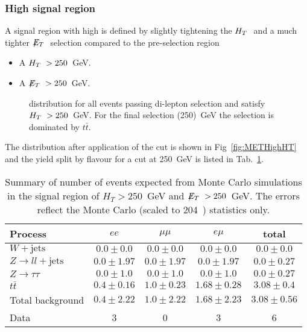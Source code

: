 \subsubsection{High \MET signal region}

A signal region with high \MET is defined by slightly tightening the $H_T~$ 
and a much tighter $\displaystyle{\not} E_T~$ selection compared to the pre-selection region
\begin{itemize}
\item A $H_T~>250$~GeV.
\item A $\displaystyle{\not} E_T~>250$~GeV.
\end{itemize}

\begin{figure}[hbtp]
  \hfill
  \caption{\MET distribution for all events passing di-lepton selection and satisfy $H_T~> 250$~GeV. For the final \MET selection (250)~GeV the selection is dominated by $t\bar{t}$.}
\end{figure}

The \MET distribution after application of the \HT
cut is shown in Fig~\ref{fig:METHighHT} and
the yield split by flavour for a cut at 250~GeV is listed in Tab.~\ref{tab:HighMET}.

\begin{table}[htb]
\begin{center}
\caption{\label{tab:HighMET}\protect Summary of number of events expected from Monte Carlo simulations in 
the signal region of $H_T> 250$~GeV and $\displaystyle{\not} E_T~> 250$~GeV. The errors reflect the Monte Carlo (scaled
    to 204~\pbi) statistics only.}
\begin{tabular}{l|ccc|c}
\hline
Process           & $ee$       & $\mu\mu$     & $e\mu$   & total   \\
\hline\hline
$W+\textrm{jets}$ &$0.0 \pm 0.0$&$0.0 \pm 0.0$&$0.0 \pm 0.0$&$0.0 \pm 0.0$\\
$Z\rightarrow ll+\textrm{jets}$&$0.0 \pm 1.97$&$0.0 \pm 1.97$&$0.0 \pm 1.97$&$0.0 \pm 0.27$\\
$Z \rightarrow \tau\tau$&$0.0 \pm 1.0$&$0.0 \pm 1.0$&$0.0 \pm 1.0$&$0.0 \pm 0.27$\\
$t\bar{t}$&$0.4 \pm 0.16$&$1.0 \pm 0.23$&$1.68 \pm 0.28$&$3.08 \pm 0.4$\\
\hline
Total background &$0.4 \pm 2.22$&$1.0 \pm 2.22$&$1.68 \pm 2.23$&$3.08 \pm 0.56$\\
\hline
Data  & 3 & 0 & 3 & 6 \\
\hline\hline
\end{tabular}
\end{center}
\end{table}
